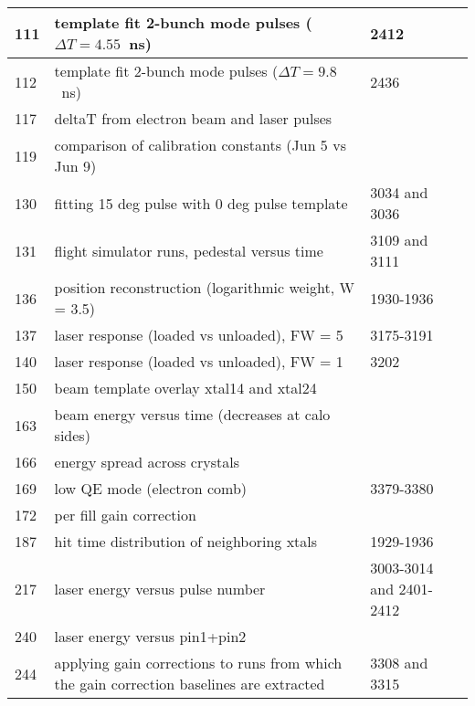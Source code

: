 \begin{longtable}{|p{1.5cm}|p{9.5cm}|p{4cm}|}
111 & template fit 2-bunch mode pulses  ($\Delta T = 4.55$~ns) & 2412 \\ \hline
112 & template fit 2-bunch mode pulses  ($\Delta T = 9.8$~ns) & 2436 \\ \hline
117 & deltaT from electron beam and laser pulses & \\ \hline
119 & comparison of calibration constants (Jun 5 vs Jun 9) & \\ \hline
130 & fitting 15 deg pulse with 0 deg pulse template & 3034 and 3036 \\ \hline
131 & flight simulator runs, pedestal versus time & 3109 and 3111 \\ \hline
136 & position reconstruction (logarithmic weight, W = 3.5) & 1930-1936 \\ \hline
137 & laser response (loaded vs unloaded), FW = 5 & 3175-3191 \\ \hline
140 & laser response (loaded vs unloaded), FW = 1 & 3202 \\ \hline
150 & beam template overlay xtal14 and xtal24 & \\ \hline
163 & beam energy versus time (decreases at calo sides) & \\ \hline
166 & energy spread across crystals & \\ \hline
169 & low QE mode (electron comb) & 3379-3380 \\ \hline
172 & per fill gain correction &  \\ \hline
187 & hit time distribution of neighboring xtals & 1929-1936 \\ \hline
217 & laser energy versus pulse number & 3003-3014 and 2401-2412 \\ \hline
240 & laser energy versus pin1+pin2 & \\ \hline
244 & applying gain corrections to runs from which the gain correction baselines are extracted & 3308 and 3315 \\ \hline
\end{longtable}
